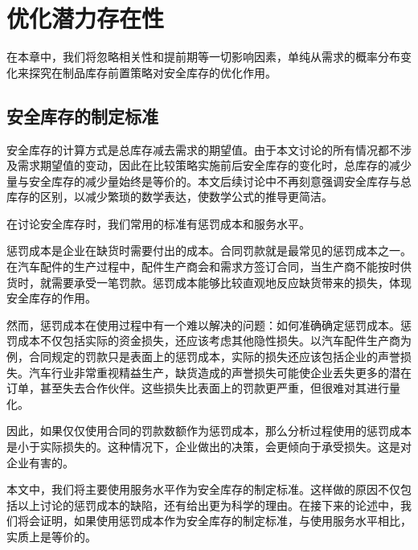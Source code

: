 
\chapter{优化潜力存在性}
\label{chapter:优化潜力}

在本章中，我们将忽略相关性和提前期等一切影响因素，单纯从需求的概率分布变化来探究在制品库存前置策略对安全库存的优化作用。






\section{安全库存的制定标准}

安全库存的计算方式是总库存减去需求的期望值。由于本文讨论的所有情况都不涉及需求期望值的变动，因此在比较策略实施前后安全库存的变化时，总库存的减少量与安全库存的减少量始终是等价的。本文后续讨论中不再刻意强调安全库存与总库存的区别，以减少繁琐的数学表达，使数学公式的推导更简洁。

在讨论安全库存时，我们常用的标准有惩罚成本和服务水平。

惩罚成本是企业在缺货时需要付出的成本。合同罚款就是最常见的惩罚成本之一。在汽车配件的生产过程中，配件生产商会和需求方签订合同，当生产商不能按时供货时，就需要承受一笔罚款。惩罚成本能够比较直观地反应缺货带来的损失，体现安全库存的作用。

然而，惩罚成本在使用过程中有一个难以解决的问题：如何准确确定惩罚成本。惩罚成本不仅包括实际的资金损失，还应该考虑其他隐性损失。以汽车配件生产商为例，合同规定的罚款只是表面上的惩罚成本，实际的损失还应该包括企业的声誉损失。汽车行业非常重视精益生产，缺货造成的声誉损失可能使企业丢失更多的潜在订单，甚至失去合作伙伴。这些损失比表面上的罚款更严重，但很难对其进行量化。

因此，如果仅仅使用合同的罚款数额作为惩罚成本，那么分析过程使用的惩罚成本是小于实际损失的。这种情况下，企业做出的决策，会更倾向于承受损失。这是对企业有害的。

本文中，我们将主要使用服务水平作为安全库存的制定标准。这样做的原因不仅包括以上讨论的惩罚成本的缺陷，还有给出更为科学的理由。在接下来的论述中，我们将会证明，如果使用惩罚成本作为安全库存的制定标准，与使用服务水平相比，实质上是等价的。


